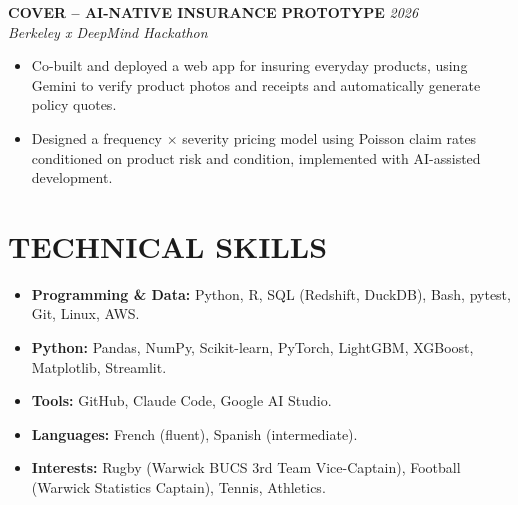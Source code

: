 \documentclass[10pt,a4paper]{article}
\begin{document}
\textbf{COVER -- AI-NATIVE INSURANCE PROTOTYPE} \hfill \textit{2026}\\
\textit{Berkeley x DeepMind Hackathon}

\begin{itemize}
    \item Co-built and deployed a web app for insuring everyday products, using Gemini to verify product photos and receipts and automatically generate policy quotes.

    \item Designed a frequency $\times$ severity pricing model using Poisson claim rates conditioned on product risk and condition, implemented with AI-assisted development.
\end{itemize}


\section*{TECHNICAL SKILLS}

\begin{itemize}
    \item \textbf{Programming \& Data:} Python, R, SQL (Redshift, DuckDB), Bash, pytest, Git, Linux, AWS.

    \item \textbf{Python:} Pandas, NumPy, Scikit-learn, PyTorch, LightGBM, XGBoost, Matplotlib, Streamlit.

    \item \textbf{Tools:} GitHub, Claude Code, Google AI Studio.

    \item \textbf{Languages:} French (fluent), Spanish (intermediate).

    \item \textbf{Interests:} Rugby (Warwick BUCS 3rd Team Vice-Captain), Football (Warwick Statistics Captain), Tennis, Athletics.
\end{itemize}
\end{document}
